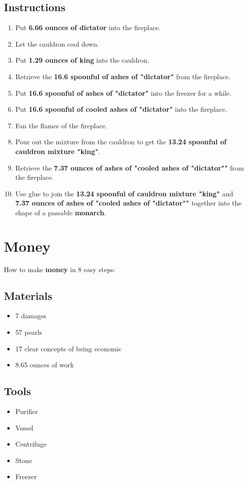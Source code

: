 \documentclass{article}
\begin{document}
\subsection{Instructions}\begin{enumerate}
\item 
Put \textbf{6.66 ounces of dictator} into the fireplace.
\item 
Let the cauldron cool down.
\item 
Put \textbf{1.29 ounces of king} into the cauldron.
\item 
Retrieve the \textbf{16.6 spoonful of ashes of "dictator"} from the fireplace.
\item 
Put \textbf{16.6 spoonful of ashes of "dictator"} into the freezer for a while.
\item 
Put \textbf{16.6 spoonful of cooled ashes of "dictator"} into the fireplace.
\item 
Fan the flames of the fireplace.
\item 
Pour out the mixture from the cauldron to get the \textbf{13.24 spoonful of cauldron mixture "king"}.
\item 
Retrieve the \textbf{7.37 ounces of ashes of "cooled ashes of "dictator""} from the fireplace.
\item 
Use glue to join the \textbf{13.24 spoonful of cauldron mixture "king"} and \textbf{7.37 ounces of ashes of "cooled ashes of "dictator""} together into the shape of a passable \textbf{monarch}.
\end{enumerate}
\newpage
\section{Money}How to make \textbf{money} in 8 easy steps:

\subsection{Materials}\begin{itemize}
\item 
7 damages
\item 
57 pearls
\item 
17 clear concepts of being economic
\item 
8.65 ounces of work
\end{itemize}
\subsection{Tools}\begin{itemize}
\item 
Purifier
\item 
Vessel
\item 
Centrifuge
\item 
Stone
\item 
Freezer
\end{itemize}
\end{document}
